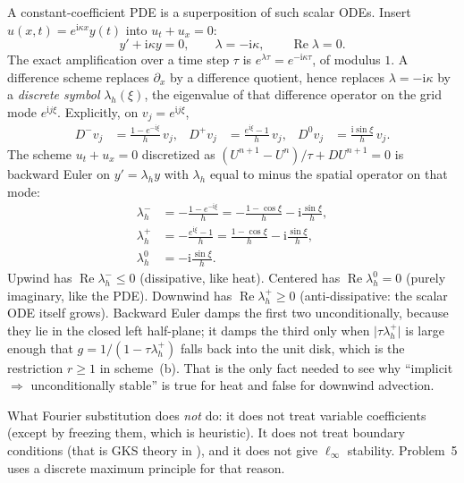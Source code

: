 \documentclass[11pt,a4paper]{article}
\begin{document}
\begin{example}
A constant-coefficient PDE is a superposition of such scalar ODEs. Insert \(u(x,t)=e^{\mathrm i\kappa x}y(t)\) into \(u_t+u_x=0\):
\[
y'+\mathrm i\kappa y=0,
\qquad
\lambda=-\mathrm i\kappa,
\qquad
\operatorname{Re}\lambda=0.
\]
The exact amplification over a time step \(\tau\) is \(e^{\lambda\tau}=e^{-\mathrm i\kappa\tau}\), of modulus \(1\). A difference scheme replaces \(\partial_x\) by a difference quotient, hence replaces \(\lambda=-\mathrm i\kappa\) by a \emph{discrete symbol} \(\lambda_h(\xi)\), the eigenvalue of that difference operator on the grid mode \(e^{\mathrm i j\xi}\). Explicitly, on \(v_j=e^{\mathrm i j\xi}\),
\begin{align*}
D^-v_j
&=
\frac{1-e^{-\mathrm i\xi}}{h}\,v_j,
&
D^+v_j
&=
\frac{e^{\mathrm i\xi}-1}{h}\,v_j,
&
D^0v_j
&=
\frac{\mathrm i\sin\xi}{h}\,v_j.
\end{align*}
The scheme \(u_t+u_x=0\) discretized as \((U^{n+1}-U^n)/\tau+D U^{n+1}=0\) is backward Euler on \(y'=\lambda_h y\) with \(\lambda_h\) equal to minus the spatial operator on that mode:
\begin{align*}
\lambda_h^-
&=
-\frac{1-e^{-\mathrm i\xi}}{h}
=
-\frac{1-\cos\xi}{h}-\mathrm i\frac{\sin\xi}{h},
\\
\lambda_h^+
&=
-\frac{e^{\mathrm i\xi}-1}{h}
=
\frac{1-\cos\xi}{h}-\mathrm i\frac{\sin\xi}{h},
\\
\lambda_h^0
&=
-\mathrm i\frac{\sin\xi}{h}.
\end{align*}
Upwind has \(\operatorname{Re}\lambda_h^-\le 0\) (dissipative, like heat). Centered has \(\operatorname{Re}\lambda_h^0=0\) (purely imaginary, like the PDE). Downwind has \(\operatorname{Re}\lambda_h^+\ge 0\) (anti-dissipative: the scalar ODE itself grows). Backward Euler damps the first two unconditionally, because they lie in the closed left half-plane; it damps the third only when \(\lvert\tau\lambda_h^+\rvert\) is large enough that \(g=1/(1-\tau\lambda_h^+)\) falls back into the unit disk, which is the restriction \(r\ge 1\) in scheme~(b). That is the only fact needed to see why ``implicit \(\Rightarrow\) unconditionally stable'' is true for heat and false for downwind advection.
\end{example}

What Fourier substitution does \emph{not} do: it does not treat variable coefficients (except by freezing them, which is heuristic). It does not treat boundary conditions (that is GKS theory in \cite{gko95}), and it does not give \(\ell_\infty\) stability. Problem~5 uses a discrete maximum principle for that reason.
\end{document}
